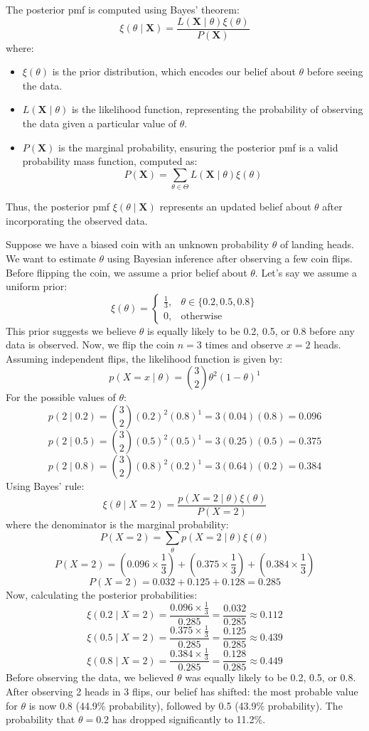 The posterior pmf is computed using Bayes' theorem:
\[
\xi(\theta \mid \mathbf{X}) = \frac{L(\mathbf{X} \mid \theta) \xi(\theta)}{P(\mathbf{X})}
\]
where:
\begin{itemize}
\item \(\xi(\theta)\) is the prior distribution, which encodes our belief about \(\theta\) before seeing the data.
\item \(L(\mathbf{X} \mid \theta)\) is the likelihood function, representing the probability of observing the data given a particular value of \(\theta\).
\item \(P(\mathbf{X})\) is the marginal probability, ensuring the posterior pmf is a valid probability mass function, computed as:
\[
P(\mathbf{X}) = \sum_{\theta \in \Theta} L(\mathbf{X} \mid \theta) \xi(\theta)
\]
\end{itemize}

Thus, the posterior pmf $\xi(\theta \mid \mathbf{X})$ represents an updated belief about $\theta$ after incorporating the observed data.

\begin{example}
Suppose we have a biased coin with an unknown probability \(\theta\) of landing heads. We want to estimate \(\theta\) using Bayesian inference after observing a few coin flips. Before flipping the coin, we assume a prior belief about \(\theta\). Let's say we assume a uniform prior:
\[
\xi(\theta) = 
\begin{cases}
\frac{1}{3}, & \theta \in \{0.2, 0.5, 0.8\} \\
0, & \text{otherwise}
\end{cases}
\]
This prior suggests we believe \(\theta\) is equally likely to be 0.2, 0.5, or 0.8 before any data is observed. Now, we flip the coin \(n=3\) times and observe \(x=2\) heads. Assuming independent flips, the likelihood function is given by:
\[
p(X = x \mid \theta) = \binom{3}{2} \theta^2 (1 - \theta)^1
\]
For the possible values of \(\theta\):
\[
p(2 \mid 0.2) = \binom{3}{2} (0.2)^2 (0.8)^1 = 3(0.04)(0.8) = 0.096
\]
\[
p(2 \mid 0.5) = \binom{3}{2} (0.5)^2 (0.5)^1 = 3(0.25)(0.5) = 0.375
\]
\[
p(2 \mid 0.8) = \binom{3}{2} (0.8)^2 (0.2)^1 = 3(0.64)(0.2) = 0.384
\]
Using Bayes' rule:
\[
\xi(\theta \mid X = 2) = \frac{p(X = 2 \mid \theta) \xi(\theta)}{P(X = 2)}
\]
where the denominator is the marginal probability:
\[
P(X = 2) = \sum_{\theta} p(X = 2 \mid \theta) \xi(\theta)
\]
\[
P(X = 2) = (0.096 \times \frac{1}{3}) + (0.375 \times \frac{1}{3}) + (0.384 \times \frac{1}{3})
\]
\[
P(X = 2) = 0.032 + 0.125 + 0.128 = 0.285
\]
Now, calculating the posterior probabilities:
\[
\xi(0.2 \mid X = 2) = \frac{0.096 \times \frac{1}{3}}{0.285} = \frac{0.032}{0.285} \approx 0.112
\]
\[
\xi(0.5 \mid X = 2) = \frac{0.375 \times \frac{1}{3}}{0.285} = \frac{0.125}{0.285} \approx 0.439
\]
\[
\xi(0.8 \mid X = 2) = \frac{0.384 \times \frac{1}{3}}{0.285} = \frac{0.128}{0.285} \approx 0.449
\]
Before observing the data, we believed \(\theta\) was equally likely to be 0.2, 0.5, or 0.8. After observing 2 heads in 3 flips, our belief has shifted: the most probable value for \(\theta\) is now 0.8 (44.9\% probability), followed by 0.5 (43.9\% probability). The probability that \(\theta = 0.2\) has dropped significantly to 11.2\%.
\end{example}

